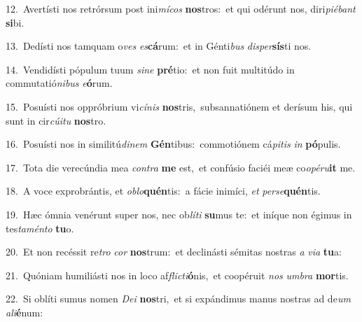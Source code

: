 {\numbfont\textcolor{\numbcolor}{12.}}~Avertísti nos retrórsum post ini\-\textit{mí}\-\textit{cos} \textbf{nos}\-tros:~\star et qui odérunt nos, diri\-\textit{pi}\-\textit{é}\textit{bant} \textbf{si}\-bi.\par
{\numbfont\textcolor{\numbcolor}{13.}}~Dedísti nos tamquam o\textit{ves} \textit{es}\-\textbf{cá}rum:~\star et in Génti\textit{bus} \textit{di}\-\textit{sper}\textbf{sís}ti nos.\par
{\numbfont\textcolor{\numbcolor}{14.}}~Vendidísti pópulum tuum \textit{si}\-\textit{ne} \textbf{pré}\-tio:~\star et non fuit multitúdo in commutatió\-\textit{ni}\-\textit{bus} \textit{e}\-\textbf{ó}rum.\par
{\numbfont\textcolor{\numbcolor}{15.}}~Posuísti nos oppróbrium vi\-\textit{cí}\-\textit{nis} \textbf{nos}\-tris,~\star subsannatiónem et derísum his, qui sunt in cir\-\textit{cú}\-\textit{i}\textit{tu} \textbf{nos}\-tro.\par
{\numbfont\textcolor{\numbcolor}{16.}}~Posuísti nos in similitú\-\textit{di}\-\textit{nem} \textbf{Gén}\-tibus:~\star commotiónem cá\-\textit{pi}\-\textit{tis} \textit{in} \textbf{pó}\-pulis.\par
{\numbfont\textcolor{\numbcolor}{17.}}~Tota die verecúndia mea \textit{con}\-\textit{tra} \textbf{me} est,~\star et confúsio faciéi meæ co\-\textit{o}\-\textit{pé}\textit{ru}\textbf{it} me.\par
{\numbfont\textcolor{\numbcolor}{18.}}~A voce exprobrántis, et \textit{ob}\-\textit{lo}\textbf{quén}tis:~\star a fácie inimíci, \textit{et} \textit{per}\-\textit{se}\textbf{quén}tis.\par
{\numbfont\textcolor{\numbcolor}{19.}}~Hæc ómnia venérunt super nos, nec ob\-\textit{lí}\-\textit{ti} \textbf{su}\-mus te:~\star et iníque non égimus in tes\-\textit{ta}\-\textit{mén}\textit{to} \textbf{tu}\-o.\par
{\numbfont\textcolor{\numbcolor}{20.}}~Et non recéssit re\textit{tro} \textit{cor} \textbf{nos}\-trum:~\star et declinásti sémitas nostras \textit{a} \textit{vi}\-\textit{a} \textbf{tu}\-a:\par
{\numbfont\textcolor{\numbcolor}{21.}}~Quóniam humiliásti nos in loco af\-\textit{flic}\-\textit{ti}\textbf{ó}nis,~\star et coopéruit \textit{nos} \textit{um}\-\textit{bra} \textbf{mor}\-tis.\par
{\numbfont\textcolor{\numbcolor}{22.}}~Si oblíti sumus nomen \textit{De}\-\textit{i} \textbf{nos}\-tri,~\star et si expándimus manus nostras ad de\textit{um} \textit{a}\-\textit{li}\textbf{é}num:\par
